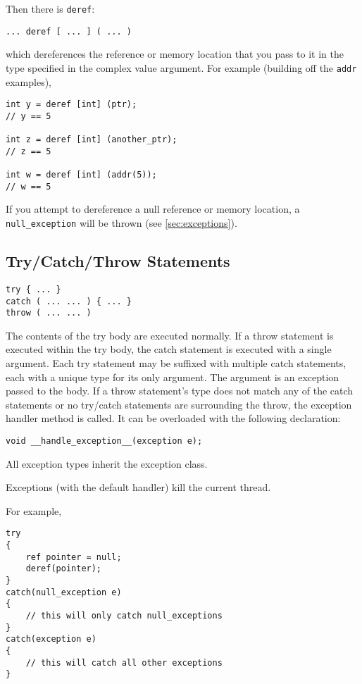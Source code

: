 \documentclass[10pt,a4paper]{article}
\begin{document}
Then there is \verb|deref|:
\begin{verbatim}
... deref [ ... ] ( ... )
\end{verbatim}

which dereferences the reference or memory location that you pass to it in the type specified in the complex value argument. For example (building off the \verb|addr| examples),
\begin{verbatim}
int y = deref [int] (ptr);
// y == 5

int z = deref [int] (another_ptr);
// z == 5

int w = deref [int] (addr(5));
// w == 5
\end{verbatim}

If you attempt to dereference a null reference or memory location, a \verb|null_exception| will be thrown (see \ref{sec:exceptions}).

\subsection{Try/Catch/Throw Statements}
\label{sec:tryCatch}
\begin{verbatim}
try { ... }
catch ( ... ... ) { ... }
throw ( ... ... )
\end{verbatim}

The contents of the try body are executed normally. If a throw statement is executed within the try body, the catch statement is executed with a single argument. Each try statement may be suffixed with multiple catch statements, each with a unique type for its only argument. The argument is an exception passed to the body. If a throw statement's type does not match any of the catch statements or no try/catch statements are surrounding the throw, the exception handler method is called. It can be overloaded with the following declaration:
\begin{verbatim}
void __handle_exception__(exception e);
\end{verbatim}

All exception types inherit the exception class.

Exceptions (with the default handler) kill the current thread. 

For example,
\begin{verbatim}
try
{
    ref pointer = null;
    deref(pointer);
}
catch(null_exception e)
{
    // this will only catch null_exceptions
}
catch(exception e)
{
    // this will catch all other exceptions
}
\end{verbatim}
\end{document}
